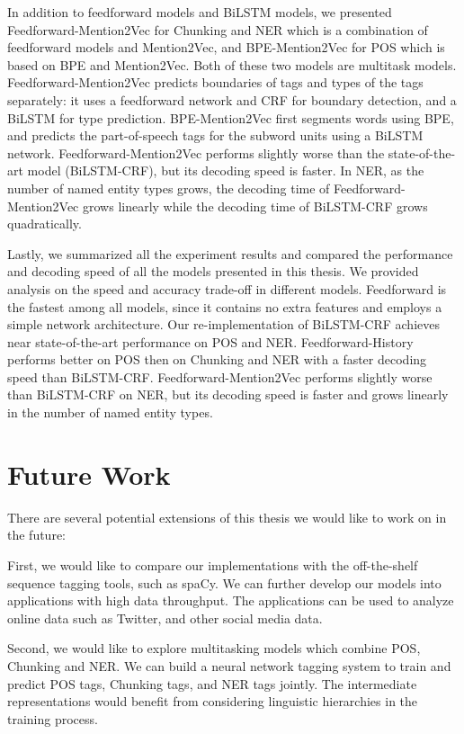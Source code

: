 \documentclass{sfuthesis}
\begin{document}
In addition to feedforward models and BiLSTM models, we presented Feedforward-Mention2Vec for Chunking and NER which is a combination of feedforward models and Mention2Vec, and BPE-Mention2Vec for POS which is based on BPE and Mention2Vec. Both of these two models are multitask models. Feedforward-Mention2Vec predicts boundaries of tags and types of the tags separately: it uses a feedforward network and CRF for boundary detection, and a BiLSTM for type prediction. BPE-Mention2Vec first segments words using BPE, and predicts the part-of-speech tags for the subword units using a BiLSTM network. Feedforward-Mention2Vec performs slightly worse than the state-of-the-art model (BiLSTM-CRF), but its decoding speed is faster. In NER, as the number of named entity types grows, the decoding time of Feedforward-Mention2Vec grows linearly while the decoding time of BiLSTM-CRF grows quadratically. 

Lastly, we summarized all the experiment results and compared the performance and decoding speed of all the models presented in this thesis. We provided analysis on the speed and accuracy trade-off in different models. Feedforward is the fastest among all models, since it contains no extra features and employs a simple network architecture. Our re-implementation of BiLSTM-CRF achieves near state-of-the-art performance on POS and NER. Feedforward-History performs better on POS then on Chunking and NER with a faster decoding speed than BiLSTM-CRF. Feedforward-Mention2Vec performs slightly worse than BiLSTM-CRF on NER, but its decoding speed is faster and grows linearly in the number of named entity types.

\section{Future Work}
There are several potential extensions of this thesis we would like to work on in the future:

First, we would like to compare our implementations with the off-the-shelf sequence tagging tools, such as spaCy. We can further develop our models into applications with high data throughput. The applications can be used to analyze online data such as Twitter, and other social media data.

Second, we would like to explore multitasking models which combine POS, Chunking and NER. We can build a neural network tagging system to train and predict POS tags, Chunking tags, and NER tags jointly. The intermediate representations would benefit from considering linguistic hierarchies in the training process.
\end{document}
